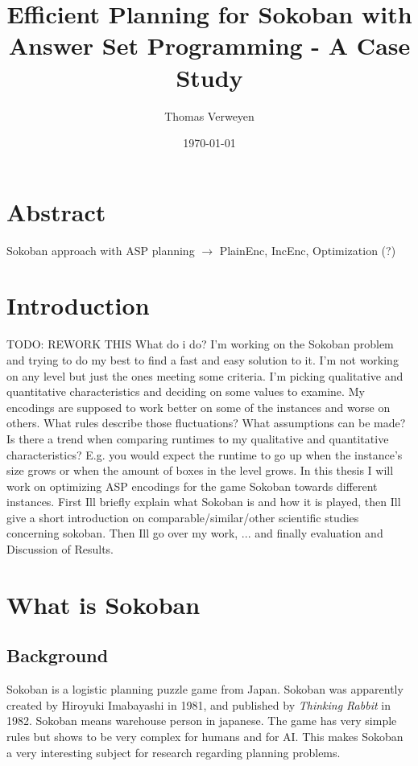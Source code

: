 \documentclass{article}
\title{Efficient Planning for Sokoban with Answer Set Programming - A Case Study}
\author{Thomas Verweyen}
\date{\today}
\begin{document}
\maketitle
\renewcommand*\contentsname{Summary}
\tableofcontents
\section*{Abstract}
Sokoban approach with ASP planning $\rightarrow$ PlainEnc, IncEnc, Optimization (?)
\section{Introduction}
TODO: REWORK THIS
What do i do? I'm working on the Sokoban problem and trying to do my best to find a fast and easy solution to it. I'm not working on any level but just the ones meeting some criteria. I'm picking qualitative and quantitative characteristics and deciding on some values to examine. My encodings are supposed to work better on some of the instances and worse on others. What rules describe those fluctuations? What assumptions can be made? Is there a trend when comparing runtimes to my qualitative and quantitative characteristics? E.g. you would expect the runtime to go up when the instance's size grows or when the amount of boxes in the level grows.
In this thesis I will work on optimizing ASP encodings for the game Sokoban towards different instances. First Ill briefly explain what Sokoban is and how it is played, then Ill give a short introduction on comparable/similar/other scientific studies concerning sokoban. Then Ill go over my work, ... and finally evaluation and Discussion of Results.
\section{What is Sokoban}
\subsection{Background}
Sokoban is a logistic planning puzzle game from Japan. Sokoban was apparently created by Hiroyuki Imabayashi in 1981, and published by \textit{Thinking Rabbit} in 1982. Sokoban means warehouse person in japanese. The game has very simple rules but shows to be very complex for humans and for AI. This makes Sokoban a very interesting subject for research regarding planning problems.
\end{document}
